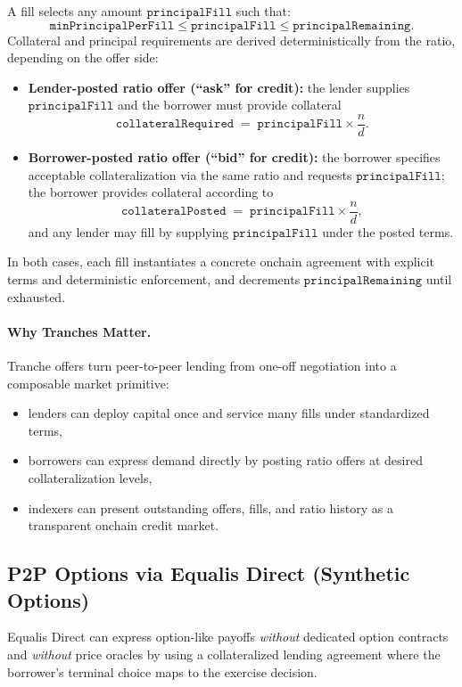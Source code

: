 \documentclass[version=preprint]{iacrcc}
\begin{document}
A fill selects any amount $\texttt{principalFill}$ such that:
\[
\texttt{minPrincipalPerFill} \le \texttt{principalFill} \le \texttt{principalRemaining}.
\]
Collateral and principal requirements are derived deterministically from the ratio, depending on the offer side:

\begin{itemize}
  \item \textbf{Lender-posted ratio offer (``ask'' for credit):} the lender supplies $\texttt{principalFill}$ and the borrower must provide collateral
  \[
  \texttt{collateralRequired} \;=\; \texttt{principalFill} \times \frac{n}{d}.
  \]
  \item \textbf{Borrower-posted ratio offer (``bid'' for credit):} the borrower specifies acceptable collateralization via the same ratio and requests $\texttt{principalFill}$; the borrower provides collateral according to
  \[
  \texttt{collateralPosted} \;=\; \texttt{principalFill} \times \frac{n}{d},
  \]
  and any lender may fill by supplying $\texttt{principalFill}$ under the posted terms.
\end{itemize}

In both cases, each fill instantiates a concrete onchain agreement with explicit terms and deterministic enforcement, and decrements $\texttt{principalRemaining}$ until exhausted.

\paragraph{Why Tranches Matter.}
Tranche offers turn peer-to-peer lending from one-off negotiation into a composable market primitive:
\begin{itemize}
  \item lenders can deploy capital once and service many fills under standardized terms,
  \item borrowers can express demand directly by posting ratio offers at desired collateralization levels,
  \item indexers can present outstanding offers, fills, and ratio history as a transparent onchain credit market.
\end{itemize}

\subsection{P2P Options via Equalis Direct (Synthetic Options)}

Equalis Direct can express option-like payoffs \emph{without} dedicated option contracts and \emph{without} price oracles by using a collateralized lending agreement where the borrower’s terminal choice maps to the exercise decision.
\end{document}
